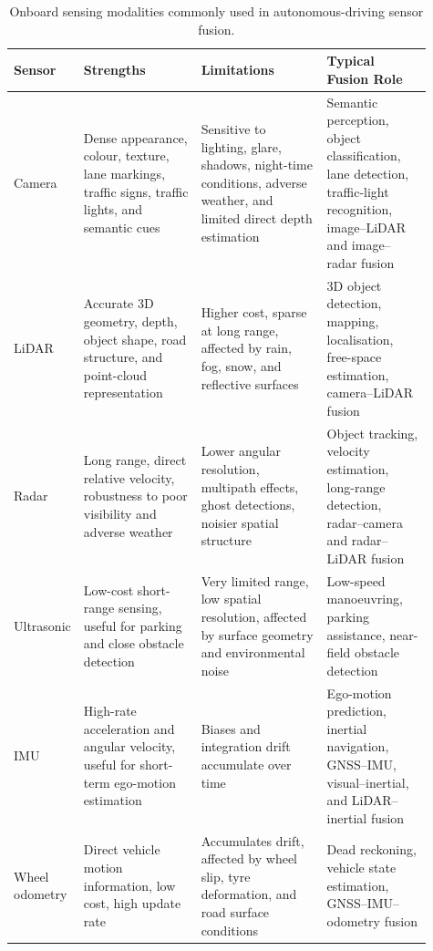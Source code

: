 \documentclass[11pt,oneside,openany]{book}
\begin{document}
\begin{table}[!t]
    \centering
    \small
    \caption{Onboard sensing modalities commonly used in autonomous-driving sensor fusion.}
    \label{tab:av-onboard-sensors}
    \begin{tabular}{p{0.08\linewidth} p{0.28\linewidth} p{0.30\linewidth} p{0.25\linewidth}}
        \hline
        \textbf{Sensor} & \textbf{Strengths} & \textbf{Limitations} & \textbf{Typical Fusion Role} \\
        \hline
        Camera & Dense appearance, colour, texture, lane markings, traffic signs, traffic lights, and semantic cues & Sensitive to lighting, glare, shadows, night-time conditions, adverse weather, and limited direct depth estimation & Semantic perception, object classification, lane detection, traffic-light recognition, image--LiDAR and image--radar fusion \\
        \hline
        LiDAR & Accurate 3D geometry, depth, object shape, road structure, and point-cloud representation & Higher cost, sparse at long range, affected by rain, fog, snow, and reflective surfaces & 3D object detection, mapping, localisation, free-space estimation, camera--LiDAR fusion \\
        \hline
        Radar & Long range, direct relative velocity, robustness to poor visibility and adverse weather & Lower angular resolution, multipath effects, ghost detections, noisier spatial structure & Object tracking, velocity estimation, long-range detection, radar--camera and radar--LiDAR fusion \\
        \hline
        Ultrasonic & Low-cost short-range sensing, useful for parking and close obstacle detection & Very limited range, low spatial resolution, affected by surface geometry and environmental noise & Low-speed manoeuvring, parking assistance, near-field obstacle detection \\
        \hline
        IMU & High-rate acceleration and angular velocity, useful for short-term ego-motion estimation & Biases and integration drift accumulate over time & Ego-motion prediction, inertial navigation, GNSS--IMU, visual--inertial, and LiDAR--inertial fusion \\
        \hline
        Wheel odometry & Direct vehicle motion information, low cost, high update rate & Accumulates drift, affected by wheel slip, tyre deformation, and road surface conditions & Dead reckoning, vehicle state estimation, GNSS--IMU--odometry fusion \\
        \hline
    \end{tabular}
\end{table}
\end{document}
